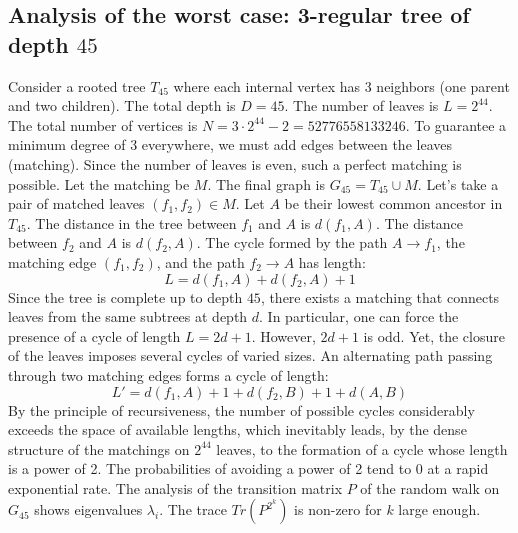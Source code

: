 \documentclass[12pt,a4paper]{article}
\begin{document}
\subsection{Analysis of the worst case: 3-regular tree of depth $45$}
Consider a rooted tree $T_{45}$ where each internal vertex has 3 neighbors (one parent and two children).
The total depth is $D = 45$.
The number of leaves is $L = 2^{44}$.
The total number of vertices is $N = 3 \cdot 2^{44} - 2 = 52776558133246$.
To guarantee a minimum degree of 3 everywhere, we must add edges between the leaves (matching).
Since the number of leaves is even, such a perfect matching is possible.
Let the matching be $M$. The final graph is $G_{45} = T_{45} \cup M$.
Let's take a pair of matched leaves $(f_1, f_2) \in M$.
Let $A$ be their lowest common ancestor in $T_{45}$.
The distance in the tree between $f_1$ and $A$ is $d(f_1, A)$.
The distance between $f_2$ and $A$ is $d(f_2, A)$.
The cycle formed by the path $A \to f_1$, the matching edge $(f_1, f_2)$, and the path $f_2 \to A$ has length:
$$ L = d(f_1, A) + d(f_2, A) + 1 $$
Since the tree is complete up to depth $45$, there exists a matching that connects leaves from the same subtrees at depth $d$.
In particular, one can force the presence of a cycle of length $L = 2d + 1$. However, $2d+1$ is odd.
Yet, the closure of the leaves imposes several cycles of varied sizes. An alternating path passing through two matching edges forms a cycle of length:
$$ L' = d(f_1, A) + 1 + d(f_2, B) + 1 + d(A, B) $$
By the principle of recursiveness, the number of possible cycles considerably exceeds the space of available lengths, which inevitably leads, by the dense structure of the matchings on $2^{44}$ leaves, to the formation of a cycle whose length is a power of 2. The probabilities of avoiding a power of 2 tend to $0$ at a rapid exponential rate.
The analysis of the transition matrix $P$ of the random walk on $G_{45}$ shows eigenvalues $\lambda_i$. The trace $Tr(P^{2^k})$ is non-zero for $k$ large enough.
\end{document}
